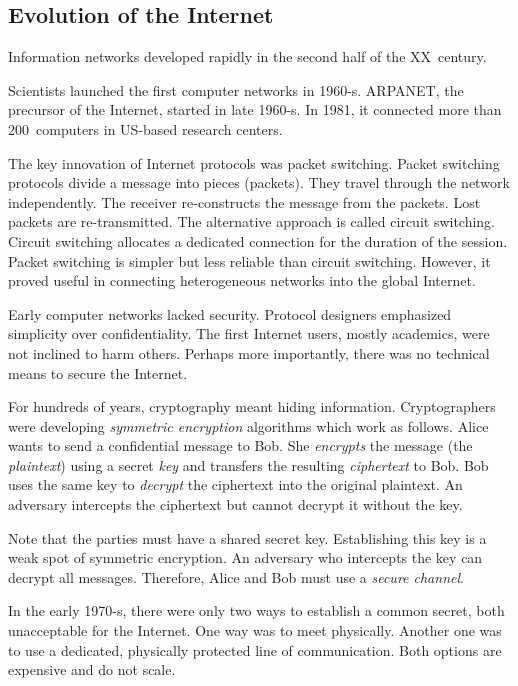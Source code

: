 \subsection{Evolution of the Internet}

Information networks developed rapidly in the second half of the XX~century.

Scientists launched the first computer networks in 1960-s.
ARPANET, the precursor of the Internet, started in late 1960-s.
In 1981, it connected more than $200$~computers in US-based research centers.

The key innovation of Internet protocols was packet switching.
Packet switching protocols divide a message into pieces (packets).
They travel through the network independently.
The receiver re-constructs the message from the packets.
Lost packets are re-transmitted.
The alternative approach is called circuit switching.
Circuit switching allocates a dedicated connection for the duration of the session.
Packet switching is simpler but less reliable than circuit switching.
However, it proved useful in connecting heterogeneous networks into the global Internet.

Early computer networks lacked security.
Protocol designers emphasized simplicity over confidentiality.
The first Internet users, mostly academics, were not inclined to harm others.
Perhaps more importantly, there was no technical means to secure the Internet.

For hundreds of years, cryptography meant hiding information.
Cryptographers were developing \textit{symmetric encryption} algorithms which work as follows.
Alice wants to send a confidential message to Bob.
She \textit{encrypts} the message (the \textit{plaintext}) using a secret \textit{key} and transfers the resulting \textit{ciphertext} to Bob.
Bob uses the same key to \textit{decrypt} the ciphertext into the original plaintext.
An adversary intercepts the ciphertext but cannot decrypt it without the key.

Note that the parties must have a shared secret key.
Establishing this key is a weak spot of symmetric encryption.
An adversary who intercepts the key can decrypt all messages.
Therefore, Alice and Bob must use a \textit{secure channel}.

In the early 1970-s, there were only two ways to establish a common secret, both unacceptable for the Internet.
One way was to meet physically.
Another one was to use a dedicated, physically protected line of communication.
Both options are expensive and do not scale.

